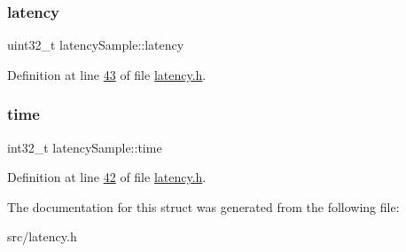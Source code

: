 \subsubsection{\texorpdfstring{latency}{latency}}
{\footnotesize\ttfamily uint32\+\_\+t latency\+Sample\+::latency}



Definition at line \hyperlink{latency_8h_source_l00043}{43} of file \hyperlink{latency_8h_source}{latency.\+h}.

\mbox{\label{structlatencySample_a163b691b85c7eeafc5f495dbaf9cb52f}} 
\subsubsection{\texorpdfstring{time}{time}}
{\footnotesize\ttfamily int32\+\_\+t latency\+Sample\+::time}



Definition at line \hyperlink{latency_8h_source_l00042}{42} of file \hyperlink{latency_8h_source}{latency.\+h}.



The documentation for this struct was generated from the following file\+:\begin{DoxyCompactItemize}
\item 
src/latency.\+h\end{DoxyCompactItemize}
